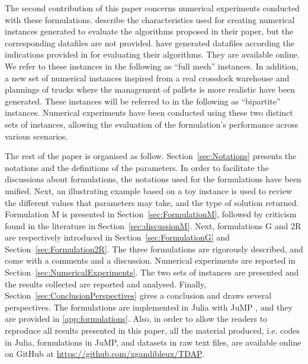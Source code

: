 \documentclass[preprint,12pt,authoryear]{elsarticle}
\begin{document}
The second contribution of this paper concerns numerical experiments conducted with these formulations.
%
\citet{MIAO2009} describe the characteristics used for creating numerical instances generated to evaluate the algorithms proposed in their paper, but the corresponding datafiles are not provided.
%
\citet{GELAREH2016}  have generated datafiles  according the indications provided in \citep{MIAO2009} for evaluating their algorithms. They are available online.
%
We refer to these instances in the following as ``full mesh'' instances.
%
In addition, a new set of numerical instances inspired from a real crossdock warehouse and plannings of trucks where the management of pallets is more realistic have been generated.
These instances will be referred to in the following as ``bipartite'' instances.
%
Numerical experiments have been conducted using these two distinct sets of instances, allowing the evaluation of the formulation's performance across various scenarios.

The rest of the paper is organised as follow.
%
Section~\ref{sec:Notations} presents  the notations and the definitions of the parameters. 
In order to facilitate the discussions about formulations,  the notations used for the formulations have been unified.
Next, an illustrating example based on a toy instance is used to review the different values that  parameters may take, and the type of solution returned.
%
Formulation M is presented in Section~\ref{sec:FormulationM}, followed by criticism found in the literature in Section~\ref{sec:discussionM}.
%
Next, formulations G and 2R are respectively introduced in Section~\ref{sec:FormulationG} and Section~\ref{sec:Formulation2R}.
The three formulations are rigorously described, and come with a comments and a discussion.
%
Numerical experiments are reported in Section~\ref{sec:NumericalExperiments}. The two sets of instances are presented and the results collected are reported and analysed.
%
Finally, Section~\ref{sec:ConclusionPerspectives} gives a conclusion and draws several perspectives.
%
The formulations are implemented in Julia \citep{Julia2017} with JuMP \citep{JuMP2023}, and they are provided in \ref{app:formulations}. 
Also, in order to allow the readers to reproduce all results presented in this paper, all the material produced, i.e. codes in Julia, formulations in JuMP, and datasets in raw text files, are available online on GitHub at \url{https://github.com/xgandibleux/TDAP}.

\newpage
%
%
\end{document}
